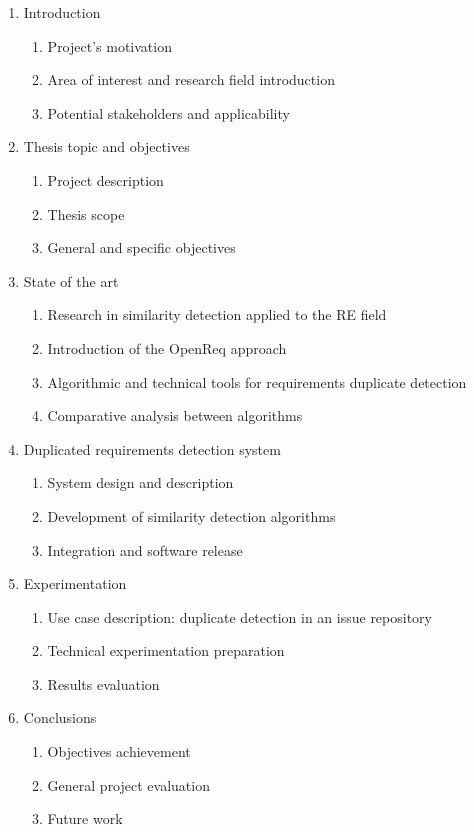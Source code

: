 \documentclass[11pt]{article}
\begin{document}
\begin{enumerate}
\item Introduction
\begin{enumerate}
\item Project's motivation
\item Area of interest and research field introduction
\item Potential stakeholders and applicability
\end{enumerate}
\item Thesis topic and objectives
\begin{enumerate}
\item Project description
\item Thesis scope
\item General and specific objectives
\end{enumerate}
\item State of the art
\begin{enumerate}
\item Research in similarity detection applied to the RE field
\item Introduction of the OpenReq approach
\item Algorithmic and technical tools for requirements duplicate detection
\item Comparative analysis between algorithms
\end{enumerate}
\item Duplicated requirements detection system
\begin{enumerate}
\item System design and description
\item Development of similarity detection algorithms
\item Integration and software release
\end{enumerate}
\item Experimentation
\begin{enumerate}
\item Use case description: duplicate detection in an issue repository
\item Technical experimentation preparation
\item Results evaluation
\end{enumerate}
\item Conclusions
\begin{enumerate}
\item Objectives achievement
\item General project evaluation
\item Future work
\end{enumerate}
\end{enumerate}
\end{document}
